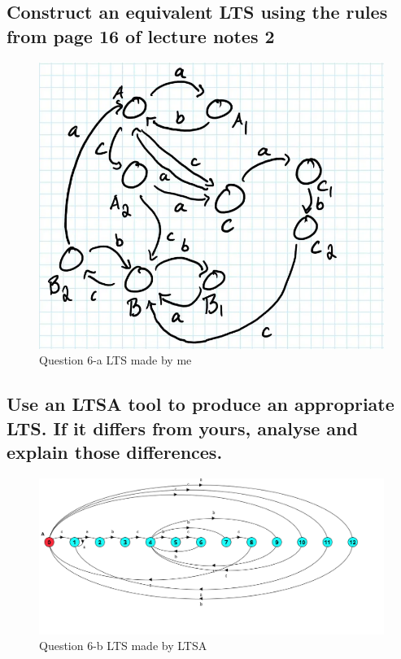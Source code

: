 \documentclass{article}[8pt]
\renewcommand{\thesubsection}{\thesection.\alph{subsection}}
\begin{document}
\subsection[~\thesubsection]{Construct an equivalent LTS using the rules from page 16 of lecture notes 2}

\begin{figure}[H]
	\includegraphics[width=\linewidth]{./imgs/Question-6-a.png}
	\caption{Question 6-a LTS made by me}
	\label{fig:Question-6-a}
\end{figure}

\subsection[~\thesubsection]{Use an LTSA tool to produce an appropriate LTS. If it differs from yours, analyse and explain those differences.}

\begin{figure}[H]
	\includegraphics[width=\linewidth]{./imgs/Question-6-b.png}
	\caption{Question 6-b LTS made by LTSA}
	\label{fig:Question-6-b}
\end{figure}
\end{document}
